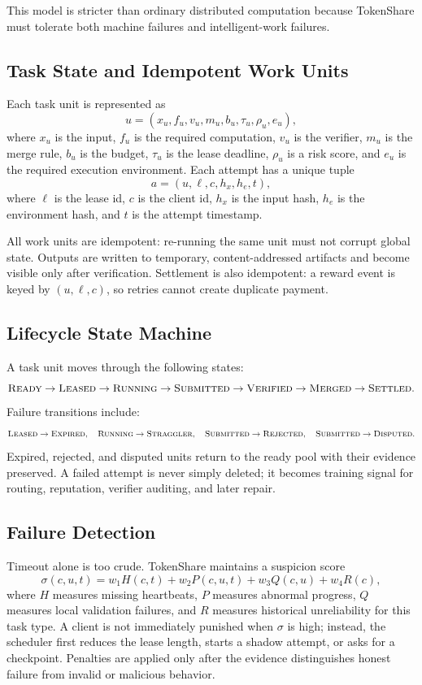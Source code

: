 \documentclass{article}
\theoremstyle{plain}
\begin{document}
This model is stricter than ordinary distributed computation because TokenShare must tolerate both machine failures and intelligent-work failures.

\subsection{Task State and Idempotent Work Units}

Each task unit is represented as
\[
u=(x_u, f_u, v_u, m_u, b_u, \tau_u, \rho_u, e_u),
\]
where $x_u$ is the input, $f_u$ is the required computation, $v_u$ is the verifier, $m_u$ is the merge rule, $b_u$ is the budget, $\tau_u$ is the lease deadline, $\rho_u$ is a risk score, and $e_u$ is the required execution environment. Each attempt has a unique tuple
\[
a=(u,\ell,c,h_x,h_e,t),
\]
where $\ell$ is the lease id, $c$ is the client id, $h_x$ is the input hash, $h_e$ is the environment hash, and $t$ is the attempt timestamp.

All work units are idempotent: re-running the same unit must not corrupt global state. Outputs are written to temporary, content-addressed artifacts and become visible only after verification. Settlement is also idempotent: a reward event is keyed by $(u,\ell,c)$, so retries cannot create duplicate payment.

\subsection{Lifecycle State Machine}

A task unit moves through the following states:
\[
\textsc{Ready} \rightarrow \textsc{Leased} \rightarrow \textsc{Running}
\rightarrow \textsc{Submitted} \rightarrow \textsc{Verified}
\rightarrow \textsc{Merged} \rightarrow \textsc{Settled}.
\]
Failure transitions include:
\[
\textsc{Leased} \rightarrow \textsc{Expired},\quad
\textsc{Running} \rightarrow \textsc{Straggler},\quad
\textsc{Submitted} \rightarrow \textsc{Rejected},\quad
\textsc{Submitted} \rightarrow \textsc{Disputed}.
\]
Expired, rejected, and disputed units return to the ready pool with their evidence preserved. A failed attempt is never simply deleted; it becomes training signal for routing, reputation, verifier auditing, and later repair.

\subsection{Failure Detection}

Timeout alone is too crude. TokenShare maintains a suspicion score
\[
\sigma(c,u,t)=
w_1 H(c,t)+w_2 P(c,u,t)+w_3 Q(c,u)+w_4 R(c),
\]
where $H$ measures missing heartbeats, $P$ measures abnormal progress, $Q$ measures local validation failures, and $R$ measures historical unreliability for this task type. A client is not immediately punished when $\sigma$ is high; instead, the scheduler first reduces the lease length, starts a shadow attempt, or asks for a checkpoint. Penalties are applied only after the evidence distinguishes honest failure from invalid or malicious behavior.
\end{document}
